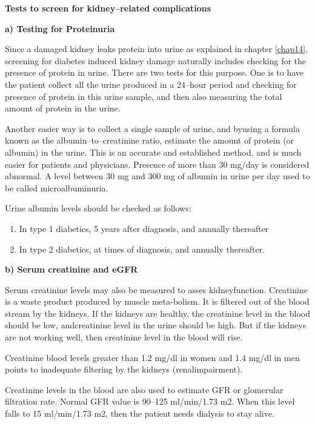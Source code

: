 \noindent\textbf{Tests to screen for kidney–related complications}

\textbf{a) Testing for Proteinuria}

Since a damaged kidney leaks protein into urine as explained in chapter \ref{chap14}, screening for diabetes induced kidney damage naturally includes checking for the presence of protein in urine. There are two tests for this purpose. One is to have the patient collect all the urine produced in a 24–hour period and checking for presence of protein in this urine sample, and then also measuring the total amount of protein in the urine.

Another easier way is to collect a single sample of urine, and by\break using a formula known as the albumin–to–creatinine ratio, estimate the amount of protein (or albumin) in the urine. This is an accurate and established method, and is much easier for patients and physicians. Presence of more than 30 mg/day is considered abnormal. A level between 30 mg and 300 mg of albumin in urine per day used to be called microalbuminuria.

\noindent Urine albumin levels should be checked as follows:

\vspace{-\topsep}
\begin{enumerate}[•]
\itemsep=0pt
\item In type 1 diabetics, 5 years after diagnosis, and annually thereafter
\item In type 2 diabetics, at times of diagnosis, and annually thereafter.
\end{enumerate}

\clearpage

\textbf{b) Serum creatinine and eGFR}

Serum creatinine levels may also be measured to asses kidney\break function. Creatinine is a waste product produced by muscle meta-\break bolism. It is filtered out of the blood stream by the kidneys. If the kidneys are healthy, the creatinine level in the blood should be low, and\break creatinine level in the urine should be high. But if the kidneys are not working well, then creatinine level in the blood will rise.

Creatinine blood levels greater than 1.2 mg/dl in women and 1.4 mg/dl in men points to inadequate filtering by the kidneys (renal\break impairment).

Creatinine levels in the blood are also used to estimate GFR or glome\-rular filtration rate. Normal GFR value is 90–125 ml/min/1.73 m2. When this level falls to 15 ml/min/1.73 m2, then the patient needs dialysis to stay alive.

